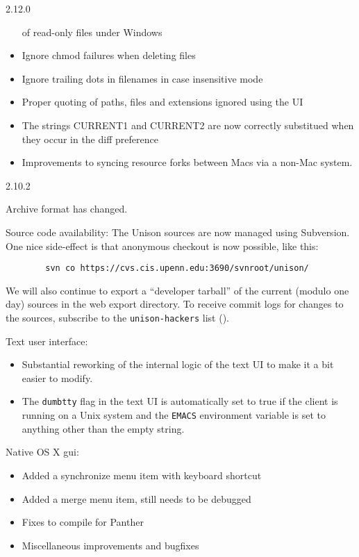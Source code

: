 \begin{changesfromversion}{2.12.0}
\begin{itemize}
  of read-only files under Windows
\item Ignore chmod failures when deleting files
\item Ignore trailing dots in filenames in case insensitive mode
\item Proper quoting of paths, files and extensions ignored using the UI
\item The strings CURRENT1 and CURRENT2 are now correctly substitued when
  they occur in the diff preference
\item Improvements to syncing resource forks between Macs via a non-Mac system.
\end{itemize}
\end{changesfromversion}

\begin{changesfromversion}{2.10.2}
\item \incompatible{} Archive format has changed.
\item Source code availability: The Unison sources are now managed using
  Subversion.  One nice side-effect is that anonymous checkout is now
  possible, like this:
\begin{verbatim}
        svn co https://cvs.cis.upenn.edu:3690/svnroot/unison/
\end{verbatim}
We will also continue to export a ``developer tarball'' of the current
(modulo one day) sources in the web export directory.  To receive commit logs
for changes to the sources, subscribe to the \verb|unison-hackers| list
().
\item Text user interface:
\begin{itemize}
\item Substantial reworking of the internal logic of the text UI to make it
a bit easier to modify.
\item The {\tt dumbtty} flag in the text UI is automatically set to true if
the client is running on a Unix system and the {\tt EMACS} environment
variable is set to anything other than the empty string.
\end{itemize}
\item Native OS X gui:
\begin{itemize}
\item Added a synchronize menu item with keyboard shortcut
\item Added a merge menu item, still needs to be debugged
\item Fixes to compile for Panther
\item Miscellaneous improvements and bugfixes

\end{itemize}
\end{changesfromversion}
